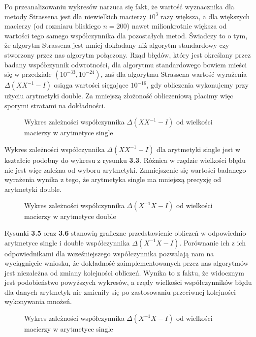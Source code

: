 Po przeanalizowaniu wykresów narzuca się fakt, że wartość wyznacznika dla metody Strassena jest dla niewielkich macierzy $10^3$ razy większa, a dla większych macierzy (od rozmiaru bliskiego $n=200$) nawet milionkrotnie większa od wartości tego samego współczynnika dla pozostałych metod. Świadczy to o tym, że algorytm Strassena jest mniej dokładany niż algorytm standardowy czy stworzony przez nas algorytm połączony.
Rząd błędów, który jest określany przez badany współczynnik odwrotności, dla algorytmu standardowego bowiem mieści się w przedziale $(10^{-33}, 10^{-24})$,
zaś dla algorytmu Strassena wartość wyrażenia $\Delta(XX^{-1}-I)$ osiąga wartości sięgające $10^{-16}$, gdy obliczenia wykonujemy przy użyciu arytmetyki double.
Za mniejszą złożoność obliczeniową płacimy więc sporymi stratami na dokładności.
\begin{figure}[h!tb]
\begin{center}

\caption{Wykres zależności współczynnika $\Delta(XX^{-1}-I)$ od wielkości macierzy w arytmetyce single}
\end{center}
\end{figure}
Wykres zależności współczynnika $\Delta(XX^{-1}-I)$ dla arytmetyki single jest w kształcie podobny do wykresu z rysunku {\bf 3.3}. Różnica w rzędzie wielkości błędu nie jest więc zależna od wyboru arytmetyki. Zmniejszenie się wartości badanego wyrażenia wynika z tego, że arytmetyka single ma mniejszą precyzję od arytmetyki double.
\begin{figure}[ht!b]
\begin{center}

\caption{Wykres zależności współczynnika $\Delta(X^{-1}X-I)$ od wielkości macierzy w arytmetyce double}
\end{center}
\end{figure}

Rysunki {\bf 3.5} oraz {\bf 3.6} stanowią graficzne przedstawienie obliczeń w odpowiednio arytmetyce single i double
współczynnika $\Delta (X^{-1}X - I)$. Porównanie ich z ich odpowiednikami dla wcześniejszego współczynnika
pozwalają nam na wyciągnięcie wniosku, że dokładność zaimplementowanych przez nas
algorytmów jest niezależna od zmiany kolejności obliczeń. Wynika to z faktu, że widocznym jest podobieństwo
powyższych wykresów, a rzędy wielkości  współczynników błędu dla danych arytmetyk nie zmieniły się po zastosowaniu przeciwnej kolejności
wykonywania mnożeń.
\begin{figure}[h!tb]
\begin{center}

\caption{Wykres zależności współczynnika $\Delta(X^{-1}X-I)$ od wielkości macierzy w arytmetyce single}
\end{center}
\end{figure}

